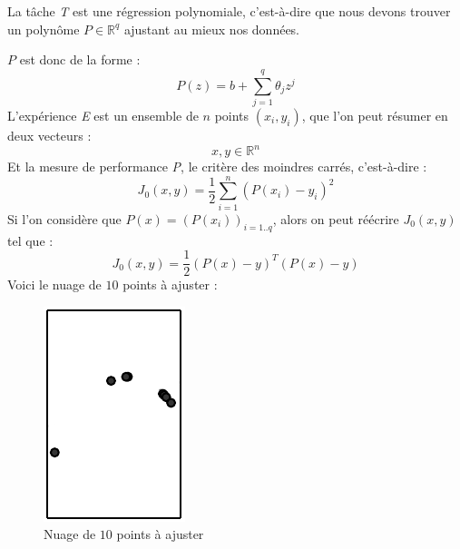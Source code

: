 \documentclass[a4paper, 11pt]{report}
\begin{document}
La tâche \emph{T} est une régression polynomiale, c'est-à-dire que nous devons trouver un polynôme $P \in \mathbb{R}^{q}$ ajustant au mieux nos données.

$P$ est donc de la forme :
$$P(z) = b + \sum_{j=1}^{q}{\theta_j z^j}$$
L'expérience \emph{E} est un ensemble de $n$ points $(x_i,y_i)$, que l'on peut résumer en deux vecteurs :
$$x, y \in \mathbb{R}^n$$
Et la mesure de performance \emph{P}, le critère des moindres carrés, c'est-à-dire :
$$J_0(x,y) =\frac{1}{2} \sum_{i=1}^{n}{(P(x_i)-y_i)^2}$$
Si l'on considère que $P(x) = (P(x_i))_{i=1..q}$, alors on peut réécrire $J_0(x,y)$ tel que :
$$J_0(x,y) = \frac{1}{2} (P(x)-y)^T(P(x)-y)$$
Voici le nuage de $10$ points à ajuster :
\begin{figure}[H]
	\centering
	\includegraphics[scale=0.5]{Images/Fitting_Problem.png}
	\caption{Nuage de $10$ points à ajuster}		
\end{figure}
			
\end{document}
